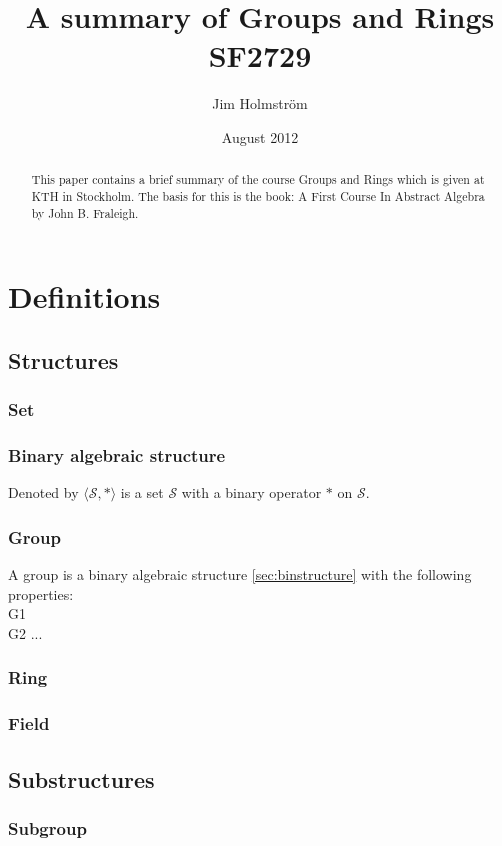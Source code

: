 \documentclass[a4paper,11pt]{kth-mag}
\title{A summary of Groups and Rings SF2729}
\subtitle{}
\author{Jim Holmstr\"{o}m}
\date{August 2012}
\renewcommand{\SS}{\ensuremath{\mathcal{S}}}
\begin{document}
\frontmatter
\pagestyle{empty}
\removepagenumbers
\maketitle
{}
\begin{abstract}
  This paper contains a brief summary of the course Groups and Rings which is
  given at KTH in Stockholm. The basis for this is the book: A First Course In
  Abstract Algebra by John B. Fraleigh.

\end{abstract}
\clearpage
\tableofcontents*
\mainmatter
\pagestyle{newchap}
\chapter{Definitions}

\section{Structures}
\subsection{Set}
\subsection{Binary algebraic structure}
\label{sec:binstructure}
Denoted by $\langle\SS,*\rangle$ is a set $\SS$ with a 
binary operator $*$ on $\SS$. 
\subsection{Group}
\label{sec:group}
A group is a binary algebraic structure \eqref{sec:binstructure} with the
following properties:\\
G1\\
G2
...

\subsection{Ring}
\label{sec:ring}
\subsection{Field}
\label{sec:field}

\section{Substructures}
\subsection{Subgroup}
\end{document}
